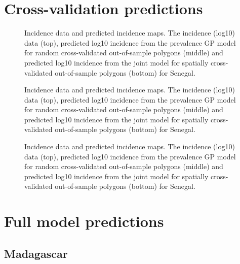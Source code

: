 \documentclass[10pt,a4]{article}
\begin{document}
\clearpage
\section{Cross-validation predictions}


\begin{figure}[h!]
\caption{\label{predobsmapsen1}
Incidence data and predicted incidence maps.
The incidence (log10) data (top), predicted log10 incidence from the prevalence GP model for random cross-validated out-of-sample polygons (middle) and predicted log10 incidence from the joint model for spatially cross-validated out-of-sample polygons (bottom) for Senegal.
}
\end{figure}



\begin{figure}[h!]
\caption{\label{predobsmapsen2}
Incidence data and predicted incidence maps.
The incidence (log10) data (top), predicted log10 incidence from the prevalence GP model for random cross-validated out-of-sample polygons (middle) and predicted log10 incidence from the joint model for spatially cross-validated out-of-sample polygons (bottom) for Senegal.
}
\end{figure}



\begin{figure}[h!]
\caption{\label{predobsmapsen3}
Incidence data and predicted incidence maps.
The incidence (log10) data (top), predicted log10 incidence from the prevalence GP model for random cross-validated out-of-sample polygons (middle) and predicted log10 incidence from the joint model for spatially cross-validated out-of-sample polygons (bottom) for Senegal.
}
\end{figure}



\clearpage
\section{Full model predictions}
\subsection{Madagascar}
\end{document}
